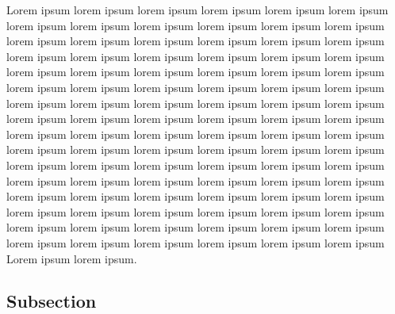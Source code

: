 \documentclass[10pt,twocolumn]{article}
\begin{document}
Lorem ipsum lorem ipsum lorem ipsum lorem ipsum lorem ipsum lorem ipsum lorem
ipsum lorem ipsum lorem ipsum lorem ipsum lorem ipsum lorem ipsum lorem ipsum
lorem ipsum lorem ipsum lorem ipsum lorem ipsum lorem ipsum lorem ipsum lorem
ipsum lorem ipsum lorem ipsum lorem ipsum lorem ipsum lorem ipsum lorem ipsum
lorem ipsum lorem ipsum lorem ipsum lorem ipsum lorem ipsum lorem ipsum lorem
ipsum lorem ipsum lorem ipsum lorem ipsum lorem ipsum lorem ipsum lorem ipsum
lorem ipsum lorem ipsum lorem ipsum lorem ipsum lorem ipsum lorem ipsum lorem
ipsum lorem ipsum lorem ipsum lorem ipsum lorem ipsum lorem ipsum lorem ipsum
lorem ipsum lorem ipsum lorem ipsum lorem ipsum lorem ipsum lorem ipsum lorem
ipsum lorem ipsum lorem ipsum lorem ipsum lorem ipsum lorem ipsum lorem ipsum
lorem ipsum lorem ipsum lorem ipsum lorem ipsum lorem ipsum lorem ipsum lorem
ipsum lorem ipsum lorem ipsum lorem ipsum lorem ipsum lorem ipsum lorem ipsum
lorem ipsum lorem ipsum lorem ipsum lorem ipsum lorem ipsum lorem ipsum lorem
ipsum lorem ipsum lorem ipsum lorem ipsum lorem ipsum lorem ipsum lorem ipsum
lorem ipsum lorem ipsum lorem ipsum lorem ipsum lorem ipsum Lorem ipsum lorem
ipsum.

\subsection{Subsection}
\end{document}
